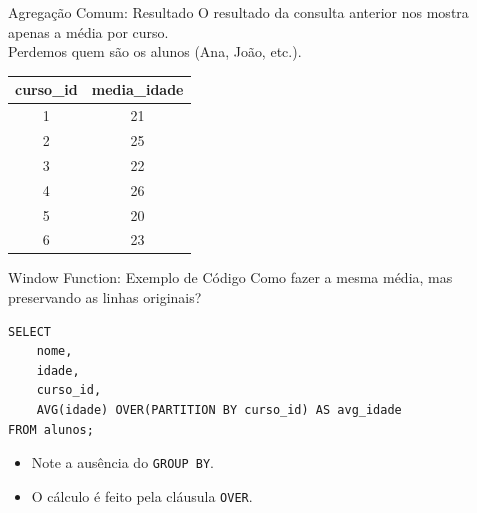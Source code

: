 \documentclass[9pt]{beamer}
\begin{document}
\begin{frame}{Agregação Comum: Resultado}
    O resultado da consulta anterior nos mostra apenas a média por curso. \\
    Perdemos quem são os alunos (Ana, João, etc.).
    
    \vspace{0.5cm}
    \begin{center}
        \begin{tabular}{|c|c|}
            \hline
            \textbf{curso\_id} & \textbf{media\_idade} \\
            \hline
            1 & 21 \\
            \hline
            2 & 25 \\
            \hline
            3 & 22 \\
            \hline
            4 & 26 \\
            \hline
            5 & 20 \\
            \hline
            6 & 23 \\
            \hline
        \end{tabular}
    \end{center}
\end{frame}

\begin{frame}[fragile]{Window Function: Exemplo de Código}
    Como fazer a mesma média, mas preservando as linhas originais?
    
    \begin{lstlisting}
SELECT
    nome,
    idade,
    curso_id,
    AVG(idade) OVER(PARTITION BY curso_id) AS avg_idade
FROM alunos;
    \end{lstlisting}
    
    \begin{itemize}
        \item Note a ausência do \texttt{GROUP BY}.
        \item O cálculo é feito pela cláusula \texttt{OVER}.
    \end{itemize}
\end{frame}
\end{document}
